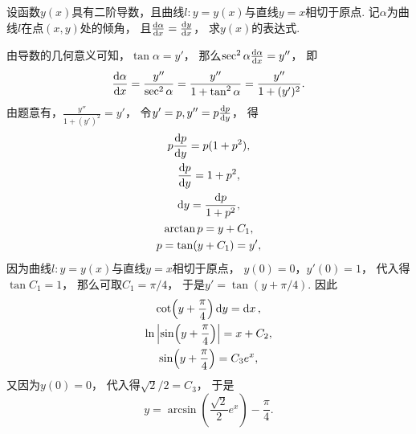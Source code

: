 \begin{example}
设函数\(y(x)\)具有二阶导数，且曲线\(l: y=y(x)\)与直线\(y=x\)相切于原点.
记\(\alpha\)为曲线\(l\)在点\((x,y)\)处的倾角，
且\(\dv{\alpha}{x}=\dv{y}{x}\)，
求\(y(x)\)的表达式.
\begin{solution}
由导数的几何意义可知，\(\tan\alpha=y'\)，
那么\(\sec^2\alpha \dv{\alpha}{x} = y''\)，
即\begin{equation*}
	\dv{\alpha}{x} = \frac{y''}{\sec^2\alpha}
	= \frac{y''}{1+\tan^2\alpha}
	= \frac{y''}{1+(y')^2}.
\end{equation*}
由题意有，\(\frac{y''}{1+(y')^2} = y'\)，
令\(y' = p,
y'' = p\dv{p}{y}\)，
得\begin{gather*}
	p\dv{p}{y} = p(1+p^2), \\
	\dv{p}{y} = 1+p^2, \\
	\dd{y} = \frac{\dd{p}}{1+p^2}, \\
	\arctan p = y + C_1, \\
	p = \tan(y+C_1) = y',
\end{gather*}
因为曲线\(l: y=y(x)\)与直线\(y=x\)相切于原点，
\(y(0) = 0\)，\(y'(0) = 1\)，
代入得\(\tan C_1 = 1\)，
那么可取\(C_1 = \pi/4\)，
于是\(y' = \tan(y+\pi/4)\).
因此\begin{gather*}
	\cot(y+\frac{\pi}{4}) \dd{y} = \dd{x}, \\
	\ln\abs{\sin(y+\frac{\pi}{4})} = x + C_2, \\
	\sin(y+\frac{\pi}{4}) = C_3 e^x,
\end{gather*}
又因为\(y(0) = 0\)，
代入得\(\sqrt{2}/2 = C_3\)，
于是\begin{equation*}
	y = \arcsin(\frac{\sqrt{2}}{2} e^x) - \frac{\pi}{4}.
\end{equation*}
\end{solution}
\end{example}

